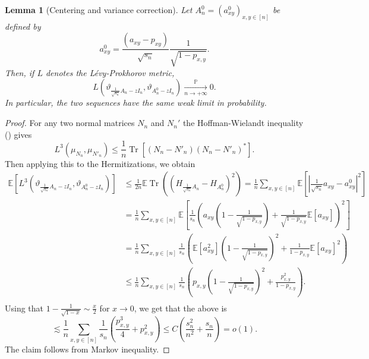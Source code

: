 \documentclass[11pt,oneside]{amsart}
\theoremstyle{plain}
\newtheorem{lemma}[theorem]{Lemma}
\numberwithin{equation}{section}
\newcommand{\E}{\mathbb{E}}
\newcommand{\p}{\mathbb{P}}
\newcommand{\pconv}{\xrightarrow[\textit{n} \to +\infty]{\quad \p \quad}}
\newcommand{\scaling}{s_n}
\DeclareMathOperator{\trace}{Tr}
\begin{document}
\begin{lemma}[Centering and variance correction] 
\label{lem:centering}  
    Let $A_n^0=(a_{xy}^0)_{x,y\in [n]}$ be defined by
    \begin{equation} \label{eq:a0}
        a_{xy}^0 = \frac{ \left(a_{xy}- p_{xy}\right)}{\sqrt{\scaling}}\frac{1}{\sqrt{1-p_{x,y}}}.
    \end{equation}
    Then, if $L$ denotes the 
Lévy-Prokhorov metric,  $$L\left(\vartheta_{\tfrac{1}{\sqrt{\scaling}}{A}_n -zI_n}, \vartheta_{{A}_n^0 -zI_n}\right)\pconv 0.$$
    In particular, the two sequences have the same weak limit in probability. 
\end{lemma}
\begin{proof}
    For any two normal matrices $N_n$ and $N_n'$ the Hoffman-Wielandt inequality (\cite{BS}) gives 
\begin{equation} \label{eq:Hoffman-Wielandt}
    L^3(\mu_{N_n}, \mu_{N'_n}) \le \frac1n \trace[(N_n - N'_n)(N_n - N'_n)^*].
\end{equation}
Then applying this to the Hermitizations, we obtain
 \begin{equation}
    \begin{split}
        \E[L^3(\vartheta_{\tfrac{1}{\sqrt{\scaling}}{A}_n -zI_n},\vartheta_{{A}_n^0 -zI_n})]
        &\le \frac1{2n} \E\trace \left(\left( H_{\tfrac{1}{\sqrt{\scaling}}{A}_n}-H_{{A}_n^0}\right)^2\right)
        =\frac{1}{n} \sum_{x,y \in [n]} \E[|\tfrac{1}{\sqrt{\scaling}}a_{xy}-a^0_{xy}|^2]\\
        &=\frac{1}{n} \sum_{x,y \in [n]} \E\left[\frac{1}{\scaling}\left(a_{xy}
        \left(1-\tfrac{1}{\sqrt{1-p_{x,y}}}\right)
        +\tfrac{1}{\sqrt{1-p_{x,y}}}\E[a_{xy}]\right)^2\right] \\
        & = \frac{1}{n} \sum_{x,y \in [n]}\frac{1}{\scaling}\left( \E\left[a^2_{xy}\right]
        \left(1-\tfrac{1}{\sqrt{1-p_{x,y}}}\right)^2
        +\tfrac{1}{{1-p_{x,y}}}\E[a_{xy}]^2\right)\\
        &\le \frac{1}{n} \sum_{x,y \in [n]}\frac{1}{\scaling}\left( p_{x,y} 
        \left(1-\tfrac{1}{\sqrt{1-p_{x,y}}}\right)^2
        +\frac{p_{x,y}^2}{1-p_{x,y}}\right).\\
        \end{split}
    \end{equation}
    Using that $1-\tfrac{1}{\sqrt{1-x}}\sim \tfrac{x}{2}$ for $x\to 0$, we get that the above is
    \begin{equation}
        \lesssim \frac{1}{n} \sum_{x,y \in [n]}\frac{1}{\scaling}\left( \frac{p_{x,y}^3}{4}+p_{x,y}^2\right) \le C\left(\frac{\scaling^2}{n^2}+\frac{\scaling}{n}\right)=o(1).
    \end{equation}
    The claim follows from Markov inequality. 
\end{proof}
\end{document}
